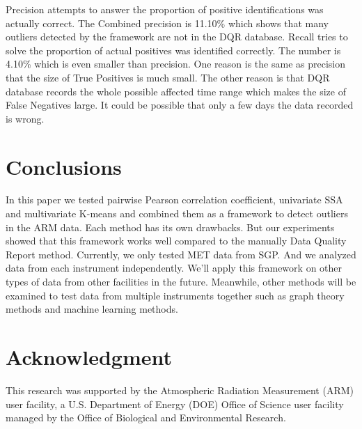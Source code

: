\documentclass[letterpaper, 10 pt, conference]{ieeeconf}  %
\begin{document}
Precision attempts to answer the proportion of positive identifications was actually correct. The Combined precision is 11.10\% which shows that many outliers detected by the framework are not in the DQR database. Recall tries to solve the proportion of actual positives was identified correctly. The number is 4.10\% which is even smaller than precision. One reason is the same as precision that the size of True Positives is much small. The other reason is that DQR database records the whole possible affected time range which makes the size of False Negatives large. It could be possible that only a few days the data recorded is wrong.

\section{Conclusions}
In this paper we tested pairwise Pearson correlation coefficient, univariate SSA and multivariate K-means and combined them as a framework to detect outliers in the ARM data. Each method has its own drawbacks. But our experiments showed that this framework works well compared to the manually Data Quality Report method. Currently, we only tested MET data from SGP. And we analyzed data from each instrument independently. We'll apply this framework on other types of data from other facilities in the future. Meanwhile, other methods will be examined to test data from multiple instruments together such as graph theory methods \cite{phillips2015graph} and machine learning methods. 


\section*{Acknowledgment}
This research was supported by the Atmospheric Radiation Measurement (ARM) user 
facility, a U.S. Department of Energy (DOE) Office of Science user facility 
managed by the Office of Biological and Environmental Research.


 

\end{document}
